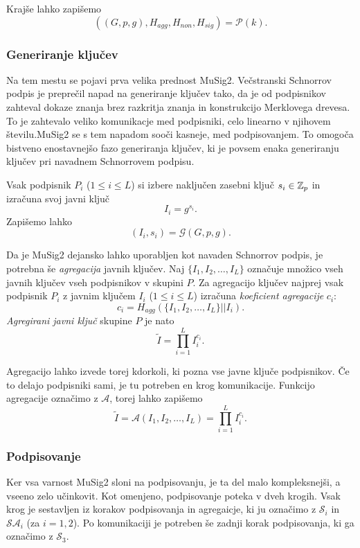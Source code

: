 Krajše lahko zapišemo
$$
((G, p, g), H_{agg}, H_{non}, H_{sig}) = \mathcal{P}(k).
$$

\subsubsection{Generiranje ključev}
Na tem mestu se pojavi prva velika prednost MuSig2. Večstranski Schnorrov podpis je preprečil napad
na generiranje ključev tako, da je od podpisnikov zahteval dokaze znanja brez razkritja znanja in
konstrukcijo Merklovega drevesa. To je zahtevalo veliko komunikacje med podpisniki, celo linearno
v njihovem številu.MuSig2 se s tem napadom sooči kasneje, med podpisovanjem. To omogoča bistveno
enostavnejšo fazo generiranja ključev, ki je povsem enaka generiranju ključev pri navadnem
Schnorrovem podpisu.

Vsak podpisnik $P_i$ ($1 \le i \le L$) si izbere naključen zasebni ključ $s_i \in \mathbb Z_p$ in izračuna
svoj javni ključ
$$
I_i = g^{s_i}.
$$
Zapišemo lahko
$$
(I_i, s_i) = \mathcal{G}(G, p, g).
$$

Da je MuSig2 dejansko lahko uporabljen kot navaden Schnorrov podpis, je potrebna še \textit{agregacija}
javnih ključev. Naj $\{I_1, I_2, \dots, I_L\}$ označuje množico vseh javnih ključev vseh podpisnikov v
skupini $P$. Za agregacijo ključev najprej vsak podpisnik $P_i$ z javnim ključem $I_i$ ($1 \le i \le L$)
izračuna \textit{koeficient agregacije} $c_i$:
$$
c_i = H_{agg}(\{I_1, I_2, \dots, I_L\} || I_i).
$$
\textit{Agregirani javni ključ} skupine $P$ je nato
$$
\tilde{I} = \prod_{i=1}^L I_i^{c_i}.
$$

Agregacijo lahko izvede torej kdorkoli, ki pozna vse javne ključe podpisnikov. Če to delajo podpisniki
sami, je tu potreben en krog komunikacije. Funkcijo agregacije označimo z $\mathcal{A}$, torej
lahko zapišemo
$$
\tilde{I} = \mathcal{A}(I_1, I_2, \dots, I_L) = \prod_{i=1}^L I_i^{c_i}.
$$

\subsubsection{Podpisovanje}
Ker vsa varnost MuSig2 sloni na podpisovanju, je ta del malo kompleksnejši, a vseeno zelo učinkovit.
Kot omenjeno, podpisovanje poteka v dveh krogih. Vsak krog je sestavljen iz korakov podpisovanja
in agregaicje, ki ju označimo z $\mathcal{S}_i$ in $\mathcal{S}\mathcal{A}_i$ (za $i = 1, 2$). Po
komunikaciji je potreben še zadnji korak podpisovanja, ki ga označimo z $\mathcal{S}_3$.

